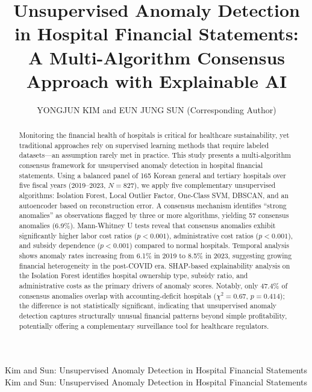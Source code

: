 \documentclass{ieeeaccess}
\begin{document}

\title{Unsupervised Anomaly Detection in Hospital Financial Statements: A Multi-Algorithm Consensus Approach with Explainable AI}

\author{
\uppercase{Yongjun Kim}
and
\uppercase{Eun Jung Sun}
(Corresponding Author)}

\address[1]{Department of Software, Ajou University, Suwon 16499, South Korea (e-mail: yjkim0123@ajou.ac.kr; ORCID: 0000-0003-4234-4883)}
\address[2]{Department of Accounting, College of Economics and Business Administration, Hannam University, Daejeon 34430, South Korea (e-mail: belle@hnu.kr)}


\markboth
{Kim and Sun: Unsupervised Anomaly Detection in Hospital Financial Statements}
{Kim and Sun: Unsupervised Anomaly Detection in Hospital Financial Statements}

\begin{abstract}
Monitoring the financial health of hospitals is critical for healthcare sustainability, yet traditional approaches rely on supervised learning methods that require labeled datasets---an assumption rarely met in practice. This study presents a multi-algorithm consensus framework for unsupervised anomaly detection in hospital financial statements. Using a balanced panel of 165 Korean general and tertiary hospitals over five fiscal years (2019--2023, $N = 827$), we apply five complementary unsupervised algorithms: Isolation Forest, Local Outlier Factor, One-Class SVM, DBSCAN, and an autoencoder based on reconstruction error. A consensus mechanism identifies ``strong anomalies'' as observations flagged by three or more algorithms, yielding 57 consensus anomalies (6.9\%). Mann-Whitney U tests reveal that consensus anomalies exhibit significantly higher labor cost ratios ($p < 0.001$), administrative cost ratios ($p < 0.001$), and subsidy dependence ($p < 0.001$) compared to normal hospitals. Temporal analysis shows anomaly rates increasing from 6.1\% in 2019 to 8.5\% in 2023, suggesting growing financial heterogeneity in the post-COVID era. SHAP-based explainability analysis on the Isolation Forest identifies hospital ownership type, subsidy ratio, and administrative costs as the primary drivers of anomaly scores. Notably, only 47.4\% of consensus anomalies overlap with accounting-deficit hospitals ($\chi^2 = 0.67$, $p = 0.414$); the difference is not statistically significant, indicating that unsupervised anomaly detection captures structurally unusual financial patterns beyond simple profitability, potentially offering a complementary surveillance tool for healthcare regulators.
\end{abstract}
\end{document}
